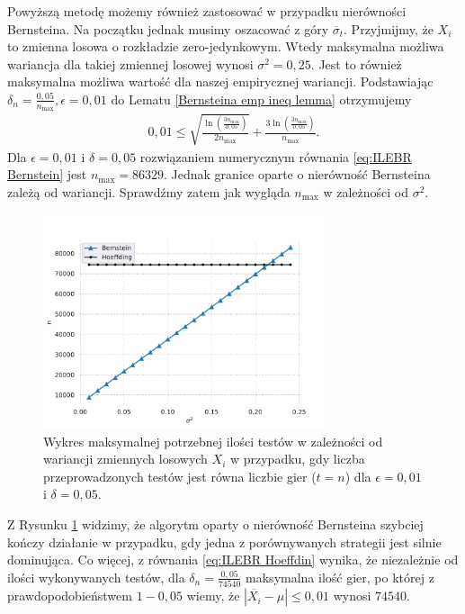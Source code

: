 \documentclass[inzynierska]{pwr_wmat_praca_dyplomowa}
\theoremstyle{plain}
\numberwithin{theorem}{chapter}
\theoremstyle{definition}
\numberwithin{theorem}{chapter}
\newcommand{\nmax}{n_{\text{max}}}
\begin{document}
	Powyższą metodę możemy również zastosować w przypadku nierówności Bernsteina.
	Na początku jednak musimy oszacować z góry $\overline{\sigma}_t$.
	Przyjmijmy, że $X_i$ to zmienna losowa o rozkładzie zero-jedynkowym.
	Wtedy maksymalna możliwa wariancja dla takiej zmiennej losowej wynosi $\sigma^2 = 0,25$. Jest to również maksymalna możliwa wartość dla naszej empirycznej wariancji. Podstawiając $\delta_{n} = \frac{0,05}{\nmax}, \epsilon = 0,01$ do Lematu \ref{Bernsteina emp ineq lemma} otrzymujemy
	\begin{gather}
		\label{eq:ILEBR Bernstein}
		0,01 \le \sqrt{\frac{\ln(\frac{3\nmax}{0,05})}{2\nmax}} + \frac{3  \ln(\frac{3\nmax}{0,05})}{\nmax}.
	\end{gather}
	Dla $\epsilon=0,01$ i $\delta=0,05$ rozwiązaniem numerycznym równania \eqref{eq:ILEBR Bernstein} jest $\nmax=86329$. Jednak granice oparte o nierówność Bernsteina zależą od wariancji. Sprawdźmy zatem jak wygląda $\nmax$ w zależności od $\sigma^2$.
	\begin{figure}
		\centering
		\includegraphics[width=0.75\textwidth]{imagens/t_eq_n.pdf}
		\caption{Wykres maksymalnej potrzebnej ilości testów w zależności od wariancji zmiennych losowych  $X_i$ w przypadku, gdy liczba przeprowadzonych testów jest równa liczbie gier ($t = n$) dla $\epsilon=0,01$ i $\delta = 0,05$.}
		\label{fig:t_eq_n}
	\end{figure}
	Z Rysunku \ref{fig:t_eq_n} widzimy, że algorytm oparty o nierówność Bernsteina szybciej kończy działanie w przypadku, gdy jedna z porównywanych strategii jest silnie dominująca. Co więcej, z równania \eqref{eq:ILEBR Hoeffdin} wynika, że niezależnie od ilości wykonywanych testów, dla $\delta_n = \frac{0,05}{74540}$ maksymalna ilość gier, po której z prawdopodobieństwem $1-0,05$ wiemy, że $|\overline{X_i} - \mu| \le 0,01$ wynosi $74540$. 
	
\end{document}
